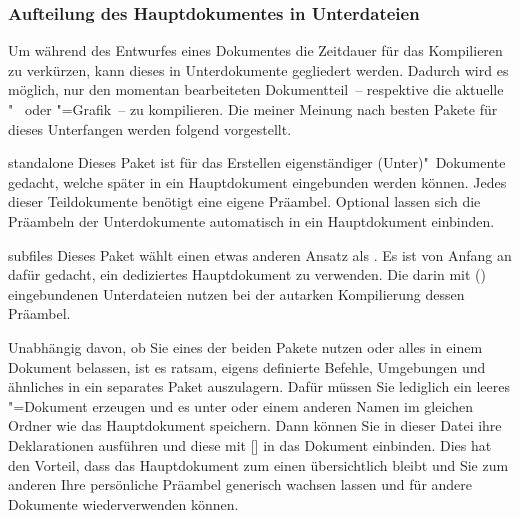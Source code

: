 \subsubsection{Aufteilung des Hauptdokumentes in Unterdateien}
Um während des Entwurfes eines Dokumentes die Zeitdauer für das Kompilieren zu 
verkürzen, kann dieses in Unterdokumente gegliedert werden. Dadurch wird es 
möglich, nur den momentan bearbeiteten Dokumentteil~-- respektive die aktuelle 
"~ oder "=Grafik~-- zu kompilieren. Die meiner 
Meinung nach besten Pakete für dieses Unterfangen werden folgend vorgestellt.
%
\begin{packages}
\item[standalone]
  Dieses Paket ist für das Erstellen eigenständiger (Unter)"~Dokumente gedacht, 
  welche später in ein Hauptdokument eingebunden werden können. Jedes dieser 
  Teildokumente benötigt eine eigene Präambel. Optional lassen sich die 
  Präambeln der Unterdokumente automatisch in ein Hauptdokument einbinden.
\item[subfiles]
  Dieses Paket wählt einen etwas anderen Ansatz als . Es 
  ist von Anfang an dafür gedacht, ein dediziertes Hauptdokument zu verwenden. 
  Die darin mit () eingebundenen Unterdateien 
  nutzen bei der autarken Kompilierung dessen Präambel.
\end{packages}
%
Unabhängig davon, ob Sie eines der beiden Pakete nutzen oder alles in einem 
Dokument belassen, ist es ratsam, eigens definierte Befehle, Umgebungen und 
ähnliches in ein separates Paket auszulagern. Dafür müssen Sie lediglich ein 
leeres "=Dokument erzeugen und es unter  
oder einem anderen Namen im gleichen Ordner wie das Hauptdokument speichern. 
Dann können Sie in dieser Datei ihre Deklarationen ausführen und diese mit 
[] in das Dokument einbinden. Dies 
hat den Vorteil, dass das Hauptdokument zum einen übersichtlich bleibt und Sie 
zum anderen Ihre persönliche Präambel generisch wachsen lassen und für andere 
Dokumente wiederverwenden können.


